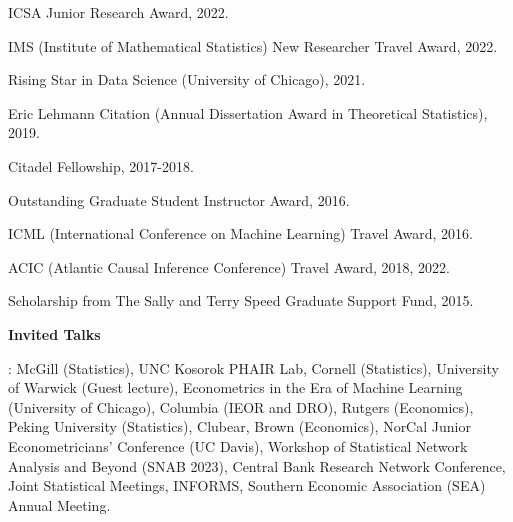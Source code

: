 \documentclass{article}
\begin{document}
ICSA Junior Research Award, 2022.

\vspace{2mm}

IMS (Institute of Mathematical Statistics) New Researcher Travel Award, 2022.

\vspace{2mm}

Rising Star in Data Science (University of Chicago), 2021.

\vspace{2mm}

Eric Lehmann Citation (Annual Dissertation Award in Theoretical Statistics), 2019.

\vspace{2mm}

Citadel Fellowship, 2017-2018.

\vspace{2mm}

Outstanding Graduate Student Instructor Award, 2016.

\vspace{2mm}
ICML (International Conference on Machine Learning) Travel Award, 2016.

\vspace{2mm}
ACIC (Atlantic Causal Inference Conference) Travel Award, 2018, 2022.

\vspace{2mm}
Scholarship from The Sally and Terry Speed Graduate Support Fund, 2015.

\vspace{5mm}

\begin{large}
\noindent \textbf{Invited Talks}
\end{large}

\vspace{4mm}
: McGill (Statistics), UNC Kosorok PHAIR Lab, Cornell (Statistics), University of Warwick (Guest lecture), Econometrics in the Era of Machine Learning (University of Chicago), Columbia (IEOR and DRO), Rutgers (Economics), Peking University (Statistics), Clubear, Brown (Economics), NorCal Junior Econometricians' Conference (UC Davis), Workshop of Statistical Network Analysis and Beyond (SNAB 2023), Central Bank Research Network Conference, Joint Statistical Meetings, INFORMS, Southern Economic Association (SEA) Annual Meeting.
\end{document}
